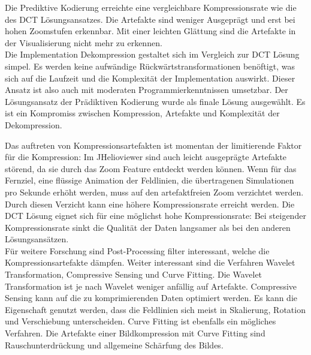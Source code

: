 Die Prediktive Kodierung erreichte eine vergleichbare Kompressionsrate wie die des DCT Lösungsansatzes. Die Artefakte sind weniger Ausgeprägt und erst bei hohen Zoomstufen erkennbar. Mit einer leichten Glättung sind die Artefakte in der Visualisierung nicht mehr zu erkennen.\\
Die Implementation Dekompression gestaltet sich im Vergleich zur DCT Lösung simpel. Es werden keine aufwändige Rückwärtstransformationen benöftigt, was sich auf die Laufzeit und die Komplexität der Implementation auswirkt. Dieser Ansatz ist also auch mit moderaten Programmierkenntnissen umsetzbar. Der Lösungsansatz der Prädiktiven Kodierung wurde als finale Lösung ausgewählt. Es ist ein Kompromiss zwischen Kompression, Artefakte und Komplexität der Dekompression.

Das auftreten von Kompressionsartefakten ist momentan der limitierende Faktor für die Kompression: Im JHelioviewer sind auch leicht ausgeprägte Artefakte störend, da sie durch das Zoom Feature entdeckt werden können. Wenn für das Fernziel, eine flüssige Animation der Feldlinien, die übertragenen Simulationen pro Sekunde erhöht werden, muss auf den artefaktfreien Zoom verzichtet werden. Durch diesen Verzicht kann eine höhere Kompressionsrate erreicht werden. Die DCT Lösung eignet sich für eine möglichst hohe Kompressionsrate: Bei steigender Kompressionsrate sinkt die Qualität der Daten langsamer als bei den anderen Lösungsansätzen.\\
Für weitere Forschung sind Post-Processing filter interessant, welche die Kompressionsartefakte dämpfen. Weiter interessant sind die Verfahren Wavelet Transformation, Compressive Sensing und Curve Fitting. Die Wavelet Transformation ist je nach Wavelet weniger anfällig auf Artefakte. Compressive Sensing kann auf die zu komprimierenden Daten optimiert werden. Es kann die Eigenschaft genutzt werden, dass die Feldlinien sich meist in Skalierung, Rotation und Verschiebung unterscheiden. Curve Fitting ist ebenfalls ein mögliches Verfahren. Die Artefakte einer Bildkompression mit Curve Fitting sind Rauschunterdrückung und allgemeine Schärfung des Bildes. 
